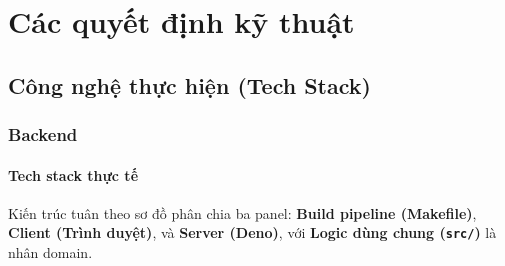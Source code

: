 \newpage

\chapter{Các quyết định kỹ thuật}

\section{Công nghệ thực hiện (Tech Stack)}
\subsection{Backend}
\subsubsection{Tech stack thực tế}

Kiến trúc tuân theo sơ đồ phân chia ba panel:
\textbf{Build pipeline (Makefile)},
\textbf{Client (Trình duyệt)},
và \textbf{Server (Deno)},
với \textbf{Logic dùng chung (\texttt{src/})} là nhân domain.
\renewcommand{\arraystretch}{1.3}

